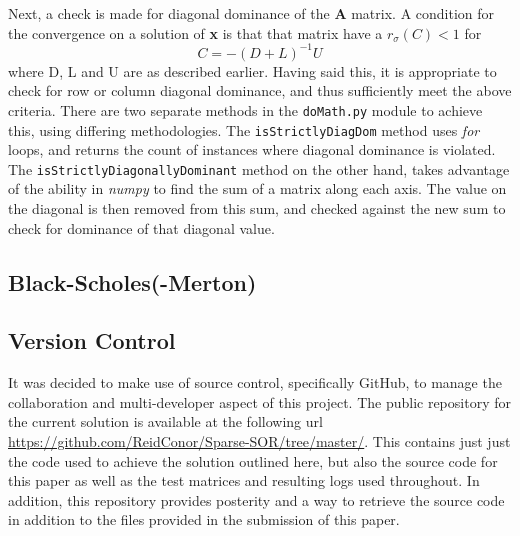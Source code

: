 \documentclass[paper=a4, fontsize=10pt]{scrartcl} %
\begin{document}
{Next, a check is made for diagonal dominance of the {\bf A} matrix. A condition for the convergence on a solution of {\bf x} is that that matrix have a $r_\sigma (C) < 1$ for 
\begin{equation}
C = -(D + L)^{-1}U
\end{equation}
where D, L and U are as described earlier. Having said this, it is appropriate to check for row or column diagonal dominance, and thus sufficiently meet the above criteria. There are two separate methods in the \texttt{doMath.py} module to achieve this, using differing methodologies. The \texttt{isStrictlyDiagDom} method uses {\it for} loops, and returns the count of instances where diagonal dominance is violated. The \texttt{isStrictlyDiagonallyDominant} method on the other hand, takes advantage of the ability in {\it numpy} to find the sum of a matrix along each axis. The value on the diagonal is then removed from this sum, and checked against the new sum to check for dominance of that diagonal value. }
\subsection{Black-Scholes(-Merton)}


\subsection {Version Control}
{It was decided to make use of source control, specifically GitHub, to manage the collaboration and multi-developer aspect of this project. The public repository for the current solution is available at the following url \url{https://github.com/ReidConor/Sparse-SOR/tree/master/}. This contains just just the code used to achieve the solution outlined here, but also the source code for this paper as well as the test matrices and resulting logs used throughout. In addition, this repository provides posterity and a way to retrieve the source code in addition to the files provided in the submission of this paper.}
\end{document}
